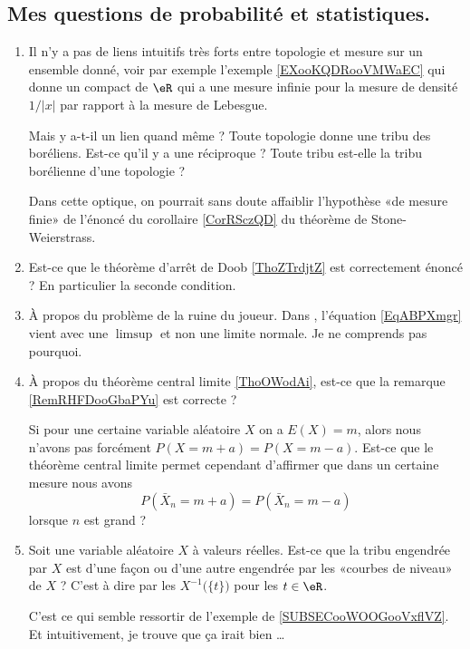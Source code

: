 \subsection{Mes questions de probabilité et statistiques.}

\begin{enumerate}
    \item
        Il n'y a pas de liens intuitifs très forts entre topologie et mesure sur un ensemble donné, voir par exemple l'exemple \ref{EXooKQDRooVMWaEC} qui donne un compact de \( \eR\) qui a une mesure infinie pour la mesure de densité \( 1/| x |\) par rapport à la mesure de Lebesgue.

        Mais y a-t-il un lien quand même ? Toute topologie donne une tribu des boréliens. Est-ce qu'il y a une réciproque ? Toute tribu est-elle la tribu borélienne d'une topologie ?

        Dans cette optique, on pourrait sans doute affaiblir l'hypothèse «de mesure finie» de l'énoncé du corollaire \ref{CorRSczQD} du théorème de Stone-Weierstrass.
    \item
        Est-ce que le théorème d'arrêt de Doob \ref{ThoZTrdjtZ} est correctement énoncé ? En particulier la seconde condition. 
    \item
        À propos du problème de la ruine du joueur. Dans \cite{KXjFWKA}, l'équation \eqref{EqABPXmgr} vient avec une \( \limsup\) et non une limite normale. Je ne comprends pas pourquoi.
    \item   \label{ItemIQDVooAcFUuH}
        À propos du théorème central limite \ref{ThoOWodAi}, est-ce que la remarque \ref{RemRHFDooGbaPYu} est correcte ? 
        
        Si pour une certaine variable aléatoire \( X\) on a \( E(X)=m\), alors nous n'avons pas forcément \( P(X=m+a)=P(X=m-a)\). Est-ce que le théorème central limite permet cependant d'affirmer que dans un certaine mesure nous avons
        \begin{equation}
            P(\bar X_n=m+a)=P(\bar X_n=m-a)
        \end{equation}
        lorsque \( n\) est grand ?
    \item
        Soit une variable aléatoire \( X\) à valeurs réelles. Est-ce que la tribu engendrée par \( X\) est d'une façon ou d'une autre engendrée par les «courbes de niveau» de \( X\) ? C'est à dire par les \( X^{-1}\big( \{ t \} \big)\) pour les \( t\in \eR\). 

        C'est ce qui semble ressortir de l'exemple de \ref{SUBSECooWOOGooVxflVZ}. Et intuitivement, je trouve que ça irait bien \ldots
\end{enumerate}

